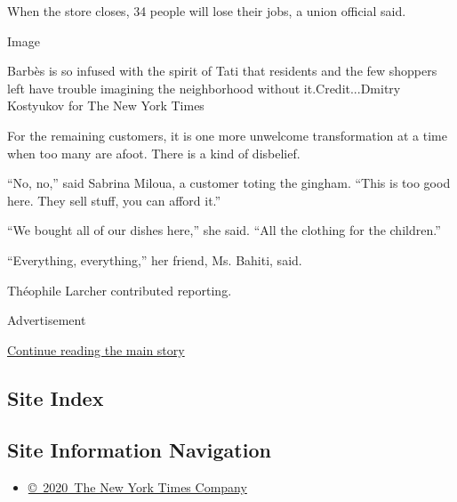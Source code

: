 When the store closes, 34 people will lose their jobs, a union official
said.

Image

Barbès is so infused with the spirit of Tati that residents and the few
shoppers left have trouble imagining the neighborhood without
it.Credit...Dmitry Kostyukov for The New York Times

For the remaining customers, it is one more unwelcome transformation at
a time when too many are afoot. There is a kind of disbelief.

``No, no,'' said Sabrina Miloua, a customer toting the gingham. ``This
is too good here. They sell stuff, you can afford it.''

``We bought all of our dishes here,'' she said. ``All the clothing for
the children.''

``Everything, everything,'' her friend, Ms. Bahiti, said.

Théophile Larcher contributed reporting.

Advertisement

\protect\hyperlink{after-bottom}{Continue reading the main story}

\hypertarget{site-index}{%
\subsection{Site Index}\label{site-index}}

\hypertarget{site-information-navigation}{%
\subsection{Site Information
Navigation}\label{site-information-navigation}}

\begin{itemize}
\tightlist
\item
  \href{https://help.nytimes.com/hc/en-us/articles/115014792127-Copyright-notice}{©~2020~The
  New York Times Company}
\end{itemize}

